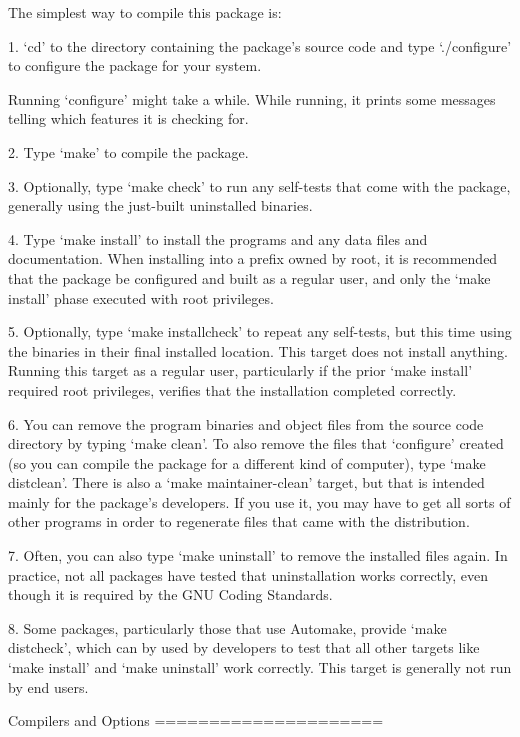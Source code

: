 \begin{DoxyVerbInclude}
   The simplest way to compile this package is:

  1. `cd' to the directory containing the package's source code and type
     `./configure' to configure the package for your system.

     Running `configure' might take a while.  While running, it prints
     some messages telling which features it is checking for.

  2. Type `make' to compile the package.

  3. Optionally, type `make check' to run any self-tests that come with
     the package, generally using the just-built uninstalled binaries.

  4. Type `make install' to install the programs and any data files and
     documentation.  When installing into a prefix owned by root, it is
     recommended that the package be configured and built as a regular
     user, and only the `make install' phase executed with root
     privileges.

  5. Optionally, type `make installcheck' to repeat any self-tests, but
     this time using the binaries in their final installed location.
     This target does not install anything.  Running this target as a
     regular user, particularly if the prior `make install' required
     root privileges, verifies that the installation completed
     correctly.

  6. You can remove the program binaries and object files from the
     source code directory by typing `make clean'.  To also remove the
     files that `configure' created (so you can compile the package for
     a different kind of computer), type `make distclean'.  There is
     also a `make maintainer-clean' target, but that is intended mainly
     for the package's developers.  If you use it, you may have to get
     all sorts of other programs in order to regenerate files that came
     with the distribution.

  7. Often, you can also type `make uninstall' to remove the installed
     files again.  In practice, not all packages have tested that
     uninstallation works correctly, even though it is required by the
     GNU Coding Standards.

  8. Some packages, particularly those that use Automake, provide `make
     distcheck', which can by used by developers to test that all other
     targets like `make install' and `make uninstall' work correctly.
     This target is generally not run by end users.

Compilers and Options
=====================


\end{DoxyVerbInclude}
